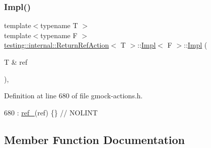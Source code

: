 \subsubsection{\texorpdfstring{Impl()}{Impl()}}
{\footnotesize\ttfamily template$<$typename T $>$ \\
template$<$typename F $>$ \\
\hyperlink{classtesting_1_1internal_1_1ReturnRefAction}{testing\+::internal\+::\+Return\+Ref\+Action}$<$ T $>$\+::\hyperlink{classtesting_1_1internal_1_1ReturnRefAction_1_1Impl}{Impl}$<$ F $>$\+::\hyperlink{classtesting_1_1internal_1_1ReturnRefAction_1_1Impl}{Impl} (\begin{DoxyParamCaption}\item[{T \&}]{ref }\end{DoxyParamCaption})\hspace{0.3cm}{\ttfamily [inline]}, {\ttfamily [explicit]}}



Definition at line 680 of file gmock-\/actions.\+h.


\begin{DoxyCode}
680 : \hyperlink{classtesting_1_1internal_1_1ReturnRefAction_1_1Impl_a647d8e360f3e2d2f4da89f7f348b40dd}{ref\_}(ref) \{\}  \textcolor{comment}{// NOLINT}
\end{DoxyCode}


\subsection{Member Function Documentation}
\mbox{\label{classtesting_1_1internal_1_1ReturnRefAction_1_1Impl_ad2899b6718fb8b8aaca38419c27c2765}} 
